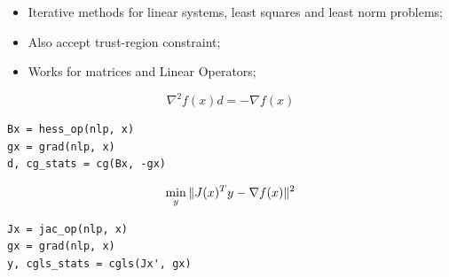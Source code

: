 \begin{frame}[fragile,t]
  \begin{itemize}
    \item Iterative methods for linear systems, least squares and least norm problems;
    \item Also accept trust-region constraint;
    \item Works for matrices and Linear Operators;
  \end{itemize}
\begin{minipage}{0.49\textwidth}
  $$ \nabla^2 f(x) d = -\nabla f(x) $$
\begin{lstlisting}
Bx = hess_op(nlp, x)
gx = grad(nlp, x)
d, cg_stats = cg(Bx, -gx)
\end{lstlisting}
\end{minipage}
\begin{minipage}{0.49\textwidth}
  $$ \min_y \Vert J(x)^Ty - \nabla f(x) \Vert^2 $$
\begin{lstlisting}
Jx = jac_op(nlp, x)
gx = grad(nlp, x)
y, cgls_stats = cgls(Jx', gx)
\end{lstlisting}
\end{minipage}
\end{frame}

